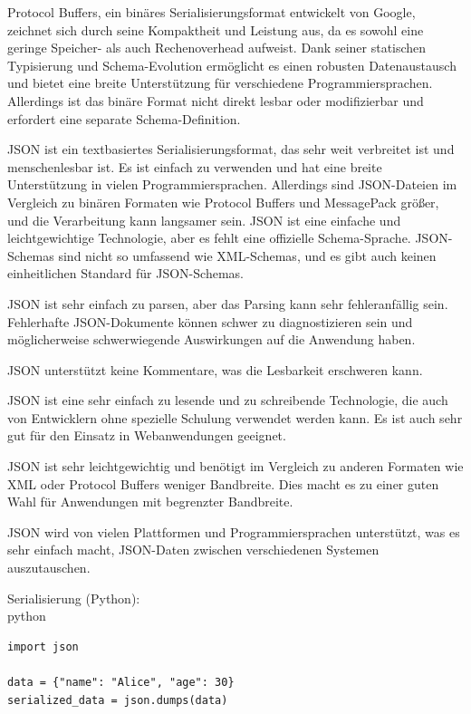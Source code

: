 Protocol Buffers, ein binäres Serialisierungsformat entwickelt von Google, zeichnet sich durch seine Kompaktheit und Leistung aus, da es sowohl eine geringe Speicher- als auch Rechenoverhead aufweist. Dank seiner statischen Typisierung und Schema-Evolution ermöglicht es einen robusten Datenaustausch und bietet eine breite Unterstützung für verschiedene Programmiersprachen. Allerdings ist das binäre Format nicht direkt lesbar oder modifizierbar und erfordert eine separate Schema-Definition.


JSON ist ein textbasiertes Serialisierungsformat, das sehr weit verbreitet ist und menschenlesbar ist. Es ist einfach zu verwenden und hat eine breite Unterstützung in vielen Programmiersprachen. Allerdings sind JSON-Dateien im Vergleich zu binären Formaten wie Protocol Buffers und MessagePack größer, und die Verarbeitung kann langsamer sein.
JSON ist eine einfache und leichtgewichtige Technologie, aber es fehlt eine offizielle Schema-Sprache. JSON-Schemas sind nicht so umfassend wie XML-Schemas, und es gibt auch keinen einheitlichen Standard für JSON-Schemas.

JSON ist sehr einfach zu parsen, aber das Parsing kann sehr fehleranfällig sein. Fehlerhafte JSON-Dokumente können schwer zu diagnostizieren sein und möglicherweise schwerwiegende Auswirkungen auf die Anwendung haben.

JSON unterstützt keine Kommentare, was die Lesbarkeit erschweren kann.

JSON ist eine sehr einfach zu lesende und zu schreibende Technologie, die auch von Entwicklern ohne spezielle Schulung verwendet werden kann. Es ist auch sehr gut für den Einsatz in Webanwendungen geeignet.

JSON ist sehr leichtgewichtig und benötigt im Vergleich zu anderen Formaten wie XML oder Protocol Buffers weniger Bandbreite. Dies macht es zu einer guten Wahl für Anwendungen mit begrenzter Bandbreite.

JSON wird von vielen Plattformen und Programmiersprachen unterstützt, was es sehr einfach macht, JSON-Daten zwischen verschiedenen Systemen auszutauschen.

Serialisierung (Python):\\
python\\
\begin{lstlisting}[caption={JSON},captionpos=b,label={lst:json}]
import json

data = {"name": "Alice", "age": 30}
serialized_data = json.dumps(data)

\end{lstlisting}

